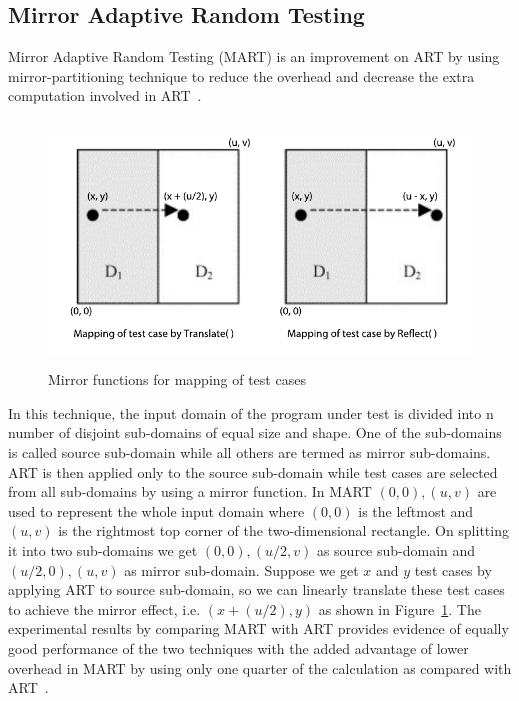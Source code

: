 \subsection{Mirror Adaptive Random Testing}
Mirror Adaptive Random Testing (MART) is an improvement on ART by using mirror-partitioning technique to reduce the overhead and decrease the extra computation involved in ART~\cite{chen2004mirror}. 
\bigskip
\bigskip
\begin{figure}[h]
\begin{center}
	\includegraphics[width=13.5cm, height=6.5cm ]{chapter2/mart2.pdf}
	\bigskip
	\caption{Mirror functions for mapping of test cases}
\label{fig:mirrorART}
\end{center}  
\end{figure}
\bigskip

In this technique, the input domain of the program under test is divided into n number of disjoint sub-domains of equal size and shape. One of the sub-domains is called source sub-domain while all others are termed as mirror sub-domains. ART is then applied only to the source sub-domain while test cases are selected from all sub-domains by using a mirror function. In MART $(0, 0), (u, v)$ are used to represent the whole input domain where $(0, 0)$ is the leftmost and $(u, v)$ is the rightmost top corner of the two-dimensional rectangle. On splitting it into two sub-domains we get $(0, 0), (u/2, v)$ as source sub-domain and $(u/2, 0), (u, v)$ as mirror sub-domain. Suppose we get $x$ and $y$ test cases by applying ART to source sub-domain, so we can linearly translate these test cases to achieve the mirror effect, i.e. $(x + (u/2), y)$ as shown in Figure~\ref{fig:mirrorART}. The experimental results by comparing MART with ART provides evidence of equally good performance of the two techniques with the added advantage of lower overhead in MART by using only one quarter of the calculation as compared with ART~\cite{chen2004mirror}.


